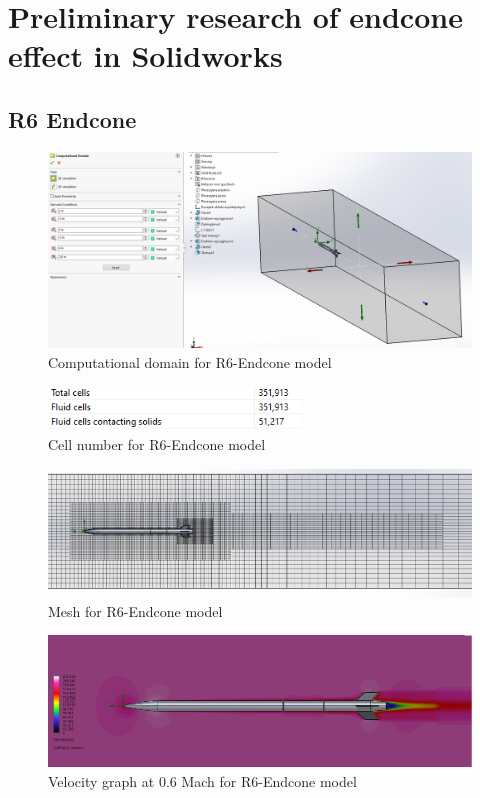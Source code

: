 \documentclass{article}
\begin{document}
\section{Preliminary research of endcone effect in Solidworks}
\subsection{R6 Endcone}
\begin{figure}[H]
    \centering
    \includegraphics[width=\textwidth]{../data/R6-Endcone-Solid/domain.png}
    \caption{Computational domain for R6-Endcone model}
\end{figure}
\begin{figure}[H]
    \centering
    \includegraphics[width=0.6\textwidth]{../data/R6-Endcone-Solid/cells.png}
    \caption{Cell number for R6-Endcone model}
\end{figure}

\begin{figure}[H]
    \centering
    \includegraphics[width=\textwidth]{../data/R6-Endcone-Solid/mesh.png}
    \caption{Mesh for R6-Endcone model}
\end{figure}
\begin{figure}[H]
    \centering
    \includegraphics[width=\textwidth]{../data/R6-Endcone-Solid/speed.png}
    \caption{Velocity graph at 0.6 Mach for R6-Endcone model}
\end{figure}
\end{document}
